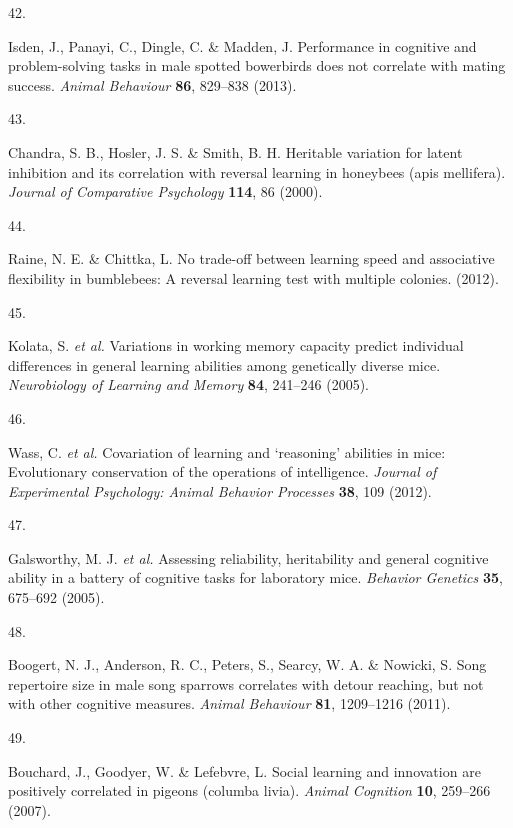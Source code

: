 \documentclass[
  man,floatsintext]{apa6}
\newlength{\cslhangindent}
\newlength{\csllabelwidth}
\newlength{\cslentryspacingunit} %
\newenvironment{CSLReferences}[2] %
 {%
  \setlength{\parindent}{0pt}
  \ifodd #1
  \let\oldpar\par
  \def\par{\hangindent=\cslhangindent\oldpar}
  \fi
  \setlength{\parskip}{#2\cslentryspacingunit}
 }%
 {}
\newcommand{\CSLLeftMargin}[1]{\parbox[t]{\csllabelwidth}{#1}}
\newcommand{\CSLRightInline}[1]{\parbox[t]{\linewidth - \csllabelwidth}{#1}\break}
\begin{document}
\begin{CSLReferences}{0}{0}
\leavevmode{}%
\CSLLeftMargin{42. }%
\CSLRightInline{Isden, J., Panayi, C., Dingle, C. \& Madden, J. Performance in cognitive and problem-solving tasks in male spotted bowerbirds does not correlate with mating success. \emph{Animal Behaviour} \textbf{86}, 829--838 (2013).}

\leavevmode{}%
\CSLLeftMargin{43. }%
\CSLRightInline{Chandra, S. B., Hosler, J. S. \& Smith, B. H. Heritable variation for latent inhibition and its correlation with reversal learning in honeybees (apis mellifera). \emph{Journal of Comparative Psychology} \textbf{114}, 86 (2000).}

\leavevmode{}%
\CSLLeftMargin{44. }%
\CSLRightInline{Raine, N. E. \& Chittka, L. No trade-off between learning speed and associative flexibility in bumblebees: A reversal learning test with multiple colonies. (2012).}

\leavevmode{}%
\CSLLeftMargin{45. }%
\CSLRightInline{Kolata, S. \emph{et al.} Variations in working memory capacity predict individual differences in general learning abilities among genetically diverse mice. \emph{Neurobiology of Learning and Memory} \textbf{84}, 241--246 (2005).}

\leavevmode{}%
\CSLLeftMargin{46. }%
\CSLRightInline{Wass, C. \emph{et al.} Covariation of learning and {`reasoning'} abilities in mice: Evolutionary conservation of the operations of intelligence. \emph{Journal of Experimental Psychology: Animal Behavior Processes} \textbf{38}, 109 (2012).}

\leavevmode{}%
\CSLLeftMargin{47. }%
\CSLRightInline{Galsworthy, M. J. \emph{et al.} Assessing reliability, heritability and general cognitive ability in a battery of cognitive tasks for laboratory mice. \emph{Behavior Genetics} \textbf{35}, 675--692 (2005).}

\leavevmode{}%
\CSLLeftMargin{48. }%
\CSLRightInline{Boogert, N. J., Anderson, R. C., Peters, S., Searcy, W. A. \& Nowicki, S. Song repertoire size in male song sparrows correlates with detour reaching, but not with other cognitive measures. \emph{Animal Behaviour} \textbf{81}, 1209--1216 (2011).}

\leavevmode{}%
\CSLLeftMargin{49. }%
\CSLRightInline{Bouchard, J., Goodyer, W. \& Lefebvre, L. Social learning and innovation are positively correlated in pigeons (columba livia). \emph{Animal Cognition} \textbf{10}, 259--266 (2007).}


\end{CSLReferences}
\end{document}

